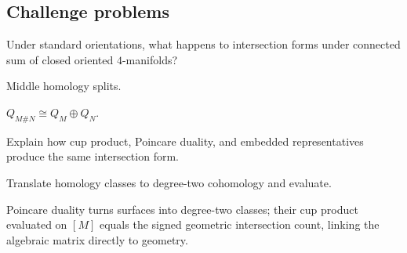 \subsection*{Challenge problems}

\begin{exercise}\label{exr:viii34-ped-15}
Under standard orientations, what happens to intersection forms under connected sum of closed oriented $4$-manifolds?
\end{exercise}
\begin{hint}
Middle homology splits.
\end{hint}
\begin{solution}
$Q_{M\#N}\cong Q_M\oplus Q_N$.
\end{solution}

\begin{exercise}\label{exr:viii34-ped-16}
Explain how cup product, Poincare duality, and embedded representatives produce the same intersection form.
\end{exercise}
\begin{hint}
Translate homology classes to degree-two cohomology and evaluate.
\end{hint}
\begin{solution}
Poincare duality turns surfaces into degree-two classes; their cup product evaluated on $[M]$ equals the signed geometric intersection count, linking the algebraic matrix directly to geometry.
\end{solution}

